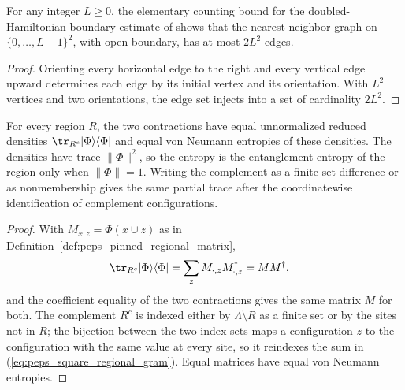 \begin{lemma}
    \label{thm:peps_square_edge_count}
    \leanok
    For any integer $L\ge0$, the elementary counting bound for the
    doubled-Hamiltonian boundary estimate of \cite{OpenAI2026PolynomialPEPS}
    shows that the nearest-neighbor graph on $\{0,\ldots,L-1\}^2$, with open
    boundary, has at most $2L^2$ edges.
\end{lemma}
\begin{proof}\leanok
    Orienting every horizontal edge to the right and every vertical edge upward
    determines each edge by its initial vertex and its orientation.
    With $L^2$ vertices and two orientations, the edge set injects
    into a set of cardinality $2L^2$.
\end{proof}

\begin{lemma}
    \label{thm:peps_square_regional_density}
    \leanok
    For every region $R$, the two contractions have equal unnormalized reduced
    densities $\tr_{R^c}|\Phi\rangle\langle\Phi|$ and equal von Neumann entropies
    of these densities. The densities have trace $\|\Phi\|^2$, so the entropy is
    the entanglement entropy of the region only when $\|\Phi\|=1$.
    Writing the complement as a finite-set difference or as nonmembership gives
    the same partial trace after the coordinatewise identification of complement
    configurations.
\end{lemma}
\begin{proof}
    \leanok
    With $M_{x,z}=\Phi(x\cup z)$ as in
    Definition~\ref{def:peps_pinned_regional_matrix},
    \begin{align}
        \tr_{R^c}|\Phi\rangle\langle\Phi|
         & =\sum_{z}M_{\cdot,z}M_{\cdot,z}^\dagger=MM^\dagger,
        \label{eq:peps_square_regional_gram}
    \end{align}
    and the coefficient equality of the two contractions gives the same matrix $M$
    for both. The complement $R^c$ is indexed either by $\Lambda\setminus R$ as a
    finite set or by the sites not in $R$; the bijection between the two index
    sets maps a configuration $z$ to the configuration with the same value at
    every site, so it reindexes the sum in (\ref{eq:peps_square_regional_gram}).
    Equal matrices have equal von Neumann entropies.
\end{proof}

